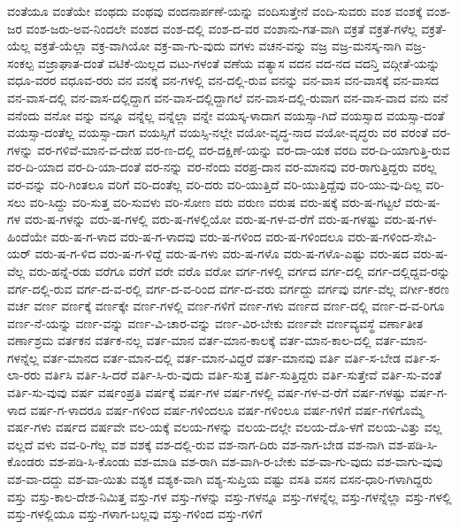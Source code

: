 {ವಂತೆಯೂ
ವಂತೆಯೇ
ವಂಥದು
ವಂಥವು
ವಂದನಾರ್ಪಣೆ-ಯನ್ನು
ವಂದಿಸುತ್ತೇನೆ
ವಂದಿ-ಸುವರು
ವಂಶ
ವಂಶಕ್ಕೆ
ವಂಶ-ಜರ
ವಂಶ-ಜರು-ಅವ-ನಿಂದಲೇ
ವಂಶದ
ವಂಶ-ದಲ್ಲಿ
ವಂಶ-ದ-ವರ
ವಂಶಾನು-ಗತ-ವಾಗಿ
ವಕ್ರತೆ
ವಕ್ರತೆ-ಗಳೆಲ್ಲ
ವಕ್ರತೆ-ಯೆಲ್ಲ
ವಕ್ರತೆ-ಯೆಲ್ಲಾ
ವಕ್ರ-ವಾಗಿಯೋ
ವಕ್ರ-ವಾ-ಗು-ವುದು
ವಗಳು
ವಚನ-ವನ್ನು
ವಜ್ರ
ವಜ್ರ-ಮನಸ್ಕ-ನಾಗಿ
ವಜ್ರ-ಸಂಕಲ್ಪ
ವಜ್ರಾಘಾತ-ದಂತೆ
ವಟಿಕೆ-ಯಿಲ್ಲದ
ವಟು-ಗಳಂತೆ
ವಣೆಯ
ವತ್ಯಾಸ
ವದನ
ವದ-ನದ
ವದನ್ತಿ
ವದ್ಗೀತೆ-ಯನ್ನು
ವಧೂ-ವರರ
ವಧೂವ-ರರು
ವನ
ವನಕ್ಕೆ
ವನ-ಗಳಲ್ಲಿ
ವನ-ದಲ್ಲಿ-ರುವ
ವನನ್ನು
ವನ-ವಾಸ
ವನ-ವಾಸಕ್ಕೆ
ವನ-ವಾಸದ
ವನ-ವಾಸ-ದಲ್ಲಿ
ವನ-ವಾಸ-ದಲ್ಲಿದ್ದಾಗ
ವನ-ವಾಸ-ದಲ್ಲಿದ್ದಾಗಲೆ
ವನ-ವಾಸ-ದಲ್ಲಿ-ರುವಾಗ
ವನ-ವಾಸ-ವಾದ
ವನು
ವನೆ
ವನೆಂದು
ವನೋ
ವನ್ನು
ವನ್ನೂ
ವನ್ನೆಲ್ಲ
ವನ್ನೆಲ್ಲಾ
ವನ್ನೇ
ವಯಸ್ಕ-ಳಾದಾಗ
ವಯಸ್ಸಾ-ಗಿದೆ
ವಯಸ್ಸಾದ
ವಯಸ್ಸಾ-ದಂತೆ
ವಯಸ್ಸಾ-ದಂತೆಲ್ಲ
ವಯಸ್ಸಾ-ದಾಗ
ವಯಸ್ಸಿಗೆ
ವಯಸ್ಸಿ-ನಲ್ಲೇ
ವಯೋ-ವೃದ್ಧ-ನಾದ
ವಯೋ-ವೃದ್ಧರು
ವರ
ವರಂತೆ
ವರ-ಗಳನ್ನು
ವರ-ಗಳಿವೆ-ಮಾನ-ವ-ದೇಹ
ವರ-ಣ-ದಲ್ಲಿ
ವರ-ದಕ್ಷಿಣೆ-ಯನ್ನು
ವರ-ದಾ-ಯಕ
ವರದಿ
ವರ-ದಿ-ಯಾಗುತ್ತಿ-ರುವ
ವರ-ದಿ-ಯಾದ
ವರ-ದಿ-ಯಾ-ದಂತೆ
ವರ-ನನ್ನು
ವರ-ನೆಂದು
ವರಪ್ರ-ದಾನ
ವರ-ಮಾನವು
ವರ-ರಾಗುತ್ತಿದ್ದರು
ವರಲ್ಲ
ವರ-ವನ್ನು
ವರಿ-ಗಿಂತಲೂ
ವರಿಗೆ
ವರಿ-ದಂತೆಲ್ಲ
ವರಿ-ದರು
ವರಿ-ಯುತ್ತಿದೆ
ವರಿ-ಯುತ್ತಿದ್ದೆವು
ವರಿ-ಯು-ವು-ದಿಲ್ಲ
ವರಿ-ಸಲು
ವರಿ-ಸಿದ್ದು
ವರಿ-ಸುತ್ತ
ವರಿ-ಸುವಳು
ವರಿ-ಸೋಣ
ವರು
ವರುಣ
ವರುಷ
ವರು-ಷಕ್ಕೆ
ವರು-ಷ-ಗಟ್ಟಲೆ
ವರು-ಷ-ಗಳ
ವರು-ಷ-ಗಳನ್ನು
ವರು-ಷ-ಗಳಲ್ಲಿ
ವರು-ಷ-ಗಳಲ್ಲಿಯೋ
ವರು-ಷ-ಗಳ-ವ-ರೆಗೆ
ವರು-ಷ-ಗಳಷ್ಟು
ವರು-ಷ-ಗಳ-ಹಿಂದೆಯೇ
ವರು-ಷ-ಗ-ಳಾದ
ವರು-ಷ-ಗ-ಳಾದವು
ವರು-ಷ-ಗಳಿಂದ
ವರು-ಷ-ಗಳಿಂದಲೂ
ವರು-ಷ-ಗಳಿಂದ-ಸೇವಿ-ಯರ್
ವರು-ಷ-ಗ-ಳಿದ
ವರು-ಷ-ಗ-ಳಿದ್ದೆ
ವರು-ಷ-ಗಳು
ವರು-ಷ-ಗಳೊ
ವರು-ಷ-ಗಳೊ-ಎಷ್ಟು
ವರು-ಷದ
ವರು-ಷ-ವೆಲ್ಲ
ವರು-ಹನ್ನೆ-ರಡು
ವರೆಗೂ
ವರೆಗೆ
ವರೇ
ವರೊ
ವರೋ
ವರ್ಗ-ಗಳಲ್ಲಿ
ವರ್ಗದ
ವರ್ಗ-ದಲ್ಲಿ
ವರ್ಗ-ದಲ್ಲಿದ್ದವ-ರನ್ನು
ವರ್ಗ-ದಲ್ಲಿ-ರುವ
ವರ್ಗ-ದ-ವ-ರಲ್ಲಿ
ವರ್ಗ-ದ-ವ-ರಿಂದ
ವರ್ಗ-ದ-ವರು
ವರ್ಗದ್ದು
ವರ್ಗವು
ವರ್ಗ-ವೆಲ್ಲ
ವರ್ಗೀ-ಕರಣ
ವರ್ಚ
ವರ್ಣ
ವರ್ಣಕ್ಕೆ
ವರ್ಣಕ್ಕೇ
ವರ್ಣ-ಗಳಲ್ಲಿ
ವರ್ಣ-ಗಳಿಗೆ
ವರ್ಣ-ಗಳು
ವರ್ಣದ
ವರ್ಣ-ದಲ್ಲಿ
ವರ್ಣ-ದ-ವ-ರಿಗೂ
ವರ್ಣ-ನೆ-ಯನ್ನು
ವರ್ಣ-ವನ್ನು
ವರ್ಣ-ವಿ-ಚಾರ-ವನ್ನು
ವರ್ಣ-ವಿರ-ಬೇಕು
ವರ್ಣವೇ
ವರ್ಣವ್ಯವಸ್ಥೆ
ವರ್ಣಾತೀತ
ವರ್ಣಾಶ್ರಮ
ವರ್ತಕನ
ವರ್ತಕ-ನಲ್ಲ
ವರ್ತ-ಮಾನ
ವರ್ತ-ಮಾನ-ಕಾಲಕ್ಕೆ
ವರ್ತ-ಮಾನ-ಕಾಲ-ದಲ್ಲಿ
ವರ್ತ-ಮಾನ-ಗಳನ್ನೆಲ್ಲ
ವರ್ತ-ಮಾನದ
ವರ್ತ-ಮಾನ-ದಲ್ಲಿ
ವರ್ತ-ಮಾನ-ವಿದ್ದರೆ
ವರ್ತ-ಮಾನವು
ವರ್ತಿ
ವರ್ತಿ-ಸ-ಬೇಡ
ವರ್ತಿ-ಸ-ಲಾ-ರರು
ವರ್ತಿಸಿ
ವರ್ತಿ-ಸಿ-ದರೆ
ವರ್ತಿ-ಸಿ-ರು-ವುದು
ವರ್ತಿ-ಸುತ್ತ
ವರ್ತಿ-ಸುತ್ತಿದ್ದರು
ವರ್ತಿ-ಸುತ್ತೇವೆ
ವರ್ತಿ-ಸು-ವಂತೆ
ವರ್ತಿ-ಸು-ವುವು
ವರ್ಷ
ವರ್ಷಂಪ್ರತಿ
ವರ್ಷಕ್ಕೆ
ವರ್ಷ-ಗಳ
ವರ್ಷ-ಗಳಲ್ಲಿ
ವರ್ಷ-ಗಳ-ವ-ರೆಗೆ
ವರ್ಷ-ಗಳಷ್ಟು
ವರ್ಷ-ಗ-ಳಾದ
ವರ್ಷ-ಗ-ಳಾದರೂ
ವರ್ಷ-ಗಳಿಂದ
ವರ್ಷ-ಗಳಿಂದಲೂ
ವರ್ಷ-ಗಳಿಂಲೂ
ವರ್ಷ-ಗಳಿಗೆ
ವರ್ಷ-ಗಳಿಗೊಮ್ಮೆ
ವರ್ಷ-ಗಳು
ವರ್ಷದ
ವರ್ಷವೇ
ವಲ-ಯಕ್ಕೆ
ವಲಯ-ಗಳನ್ನು
ವಲಯ-ದಲ್ಲೇ
ವಲಯ-ದೊ-ಳಗೆ
ವಲಯ-ವಿತ್ತು
ವಲ್ಲ
ವಲ್ಲದೆ
ವಳು
ವವ-ರಿ-ಗೆಲ್ಲ
ವಶ
ವಶಕ್ಕೆ
ವಶ-ದಲ್ಲಿ-ರುವ
ವಶ-ನಾಗ-ದಿರು
ವಶ-ನಾಗ-ಬೇಡ
ವಶ-ನಾಗಿ
ವಶ-ಪಡಿ-ಸಿ-ಕೊಂಡರು
ವಶ-ಪಡಿ-ಸಿ-ಕೊಂಡು
ವಶ-ಮಾಡಿ
ವಶ-ರಾಗಿ
ವಶ-ವಾಗಿ-ರ-ಬೇಕು
ವಶ-ವಾ-ಗು-ವುದು
ವಶ-ವಾಗು-ವುವು
ವಶ-ವಾ-ದದ್ದು
ವಶ-ವಾ-ಯಿತು
ವಶ್ಯಕ
ವಶ್ಯಕ-ವಾಗಿ
ವಶ್ಯ-ಸುಪ್ತಿಯ
ವಷ್ಟು
ವಸತಿ
ವಸನ
ವಸನ-ಧಾರಿ-ಗಳಾಗಿದ್ದರು
ವಸ್ತು
ವಸ್ತು-ಕಾಲ-ದೇಶ-ನಿಮಿತ್ತ
ವಸ್ತು-ಗಳ
ವಸ್ತು-ಗಳನ್ನು
ವಸ್ತು-ಗಳನ್ನೂ
ವಸ್ತು-ಗಳನ್ನೆಲ್ಲ
ವಸ್ತು-ಗಳನ್ನೆಲ್ಲಾ
ವಸ್ತು-ಗಳಲ್ಲಿ
ವಸ್ತು-ಗಳಲ್ಲಿಯೂ
ವಸ್ತು-ಗಳಾಗ-ಬಲ್ಲವು
ವಸ್ತು-ಗಳಿಂದ
ವಸ್ತು-ಗಳಿಗೆ
}
